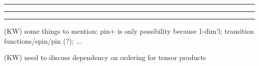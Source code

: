 \documentclass[12pt,a4paper]{article}
\newcommand{\kw}[1]{{\color{kwcolor}\footnotesize{(KW) #1}}}
\newcommand{\kwsep}{\bigskip\hrule\medskip\hrule\medskip\hrule\bigskip}
\begin{document}
\kwsep


\kw{some things to mention: pin+ is only possibility because 1-dim'l; transition functions/spin/pin (?); ...}

\kw{need to discuss dependency on ordering for tensor products}

\end{document}
